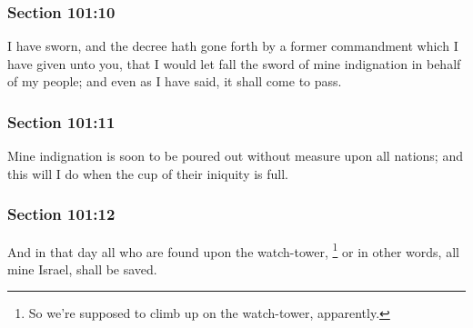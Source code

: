	\subsubsection{Section 101:10} %
		\label{DC101-10}

		I have sworn, and the decree hath gone forth by a former commandment which I have given unto you, that I would let fall the sword of mine indignation in behalf of my people; and even as I have said, it shall come to pass.


	\subsubsection{Section 101:11} %
		\label{DC101-11}

		Mine indignation is soon to be poured out without measure upon all nations; and this will I do when the cup of their iniquity is full.


	\subsubsection{Section 101:12} %
		\label{DC101-12}

		And in that day all who are found upon the watch-tower,%
			\footnote{%
				So we're supposed to climb up on the watch-tower, apparently.
				}
		or in other words, all mine Israel, shall be saved.


